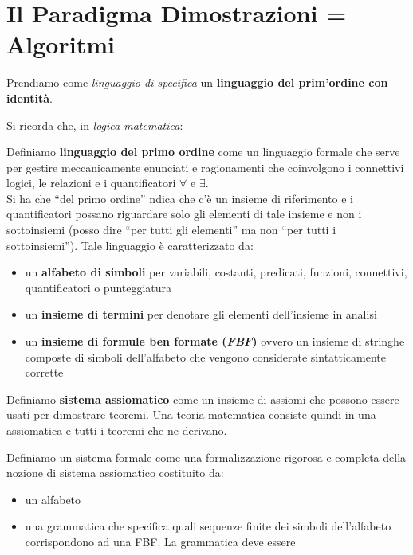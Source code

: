 \documentclass[a4paper,12pt, oneside]{book}
\begin{document}
\chapter{Il Paradigma Dimostrazioni = Algoritmi}
Prendiamo come \textit{linguaggio di specifica} un \textbf{linguaggio
  del prim'ordine con identità}.
\begin{shaded}
  Si ricorda che, in \textit{logica matematica}:
  \begin{definizione}
    Definiamo \textbf{linguaggio del primo ordine} come un linguaggio formale
    che serve per gestire meccanicamente enunciati e ragionamenti che
    coinvolgono i connettivi logici, le relazioni e i quantificatori $\forall$ e
    $\exists$.\\
    Si ha che ``del primo ordine'' ndica che c'è un insieme di riferimento e i
    quantificatori possano riguardare solo gli elementi di tale insieme e non i
    sottoinsiemi (posso dire ``per tutti gli elementi'' ma non ``per tutti i
    sottoinsiemi''). Tale linguaggio è caratterizzato da:
    \begin{itemize}
      \item un \textbf{alfabeto di simboli} per variabili, costanti, predicati,
      funzioni, connettivi, quantificatori o punteggiatura 
      \item un \textbf{insieme di termini} per denotare gli elementi
      dell'insieme in analisi
      \item un \textbf{insieme di formule ben formate (\textit{FBF})} ovvero un
      insieme di stringhe composte di simboli dell'alfabeto che vengono
      considerate sintatticamente corrette 
    \end{itemize}
  \end{definizione}
  \begin{definizione}
    Definiamo \textbf{sistema assiomatico} come un insieme di assiomi che
    possono essere usati per dimostrare teoremi. Una teoria matematica consiste
    quindi in una assiomatica e tutti i teoremi che ne derivano.  
  \end{definizione}
  \begin{definizione}
    Definiamo un sistema formale come una formalizzazione rigorosa e completa
    della nozione di sistema assiomatico costituito da:
    \begin{itemize}
      \item un alfabeto
      \item una grammatica che specifica quali sequenze finite dei simboli
      dell'alfabeto corrispondono ad una FBF. La grammatica deve essere

\end{itemize}
\end{definizione}
\end{shaded}
\end{document}
